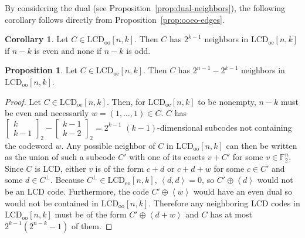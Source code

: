 \documentclass[11pt]{article}
\theoremstyle{definition}
\newtheorem{corollary}[theorem]{Corollary}
\newtheorem{proposition}[theorem]{Proposition}
\newcommand{\F}{\mathbb{F}}
\newcommand{\Qbinom}[3]{{\begin{bmatrix} #1 \\ #2 \end{bmatrix}}_{#3}} %
\newcommand{\Ang}[1]{\left\langle#1\right\rangle}
\newcommand{\LCDoo}[2]{\mathrm{LCD}_{\mathrm{oo}} [#1, #2]}
\newcommand{\LCDoe}[2]{\mathrm{LCD}_{\mathrm{oe}} [#1, #2]}
\newcommand{\LCDeo}[2]{\mathrm{LCD}_{\mathrm{eo}} [#1, #2]}
\begin{document}
By considering the dual (see Proposition~\ref{prop:dual-neighbors}), the following corollary follows directly from Proposition~\ref{prop:ooeo-edges}.

\begin{corollary}\label{cor:oooe-edges}
	Let $C \in \LCDoo{n}{k}$.
	Then $C$ has $2^{k - 1}$ neighbors in $\LCDoe{n}{k}$ if $n - k$ is even and none if $n - k$ is odd.
\end{corollary}

\begin{proposition}\label{prop:oeoo-edges}
	Let $C \in \LCDoe{n}{k}$.
	Then $C$ has $2^{n - 1} - 2^{k - 1}$ neighbors in $\LCDoo{n}{k}$.
\end{proposition}

\begin{proof}
	Let $C \in \LCDoe{n}{k}$.
	Then, for $\LCDoe{n}{k}$ to be nonempty, $n - k$ must be even and necessarily $w = (1, \ldots, 1) \in C$.
	$C$ has $\Qbinom{k}{k - 1}{2} - \Qbinom{k - 1}{k - 2}{2} = 2^{k - 1}$ $(k - 1)$-dimensional subcodes not containing the codeword $w$.
	Any possible neighbor of $C$ in $\LCDoo{n}{k}$ can then be written as the union of such a subcode $C'$ with one of its cosets $v + C'$ for some $v \in \F_2^n$.
	Since $C$ is LCD, either $v$ is of the form $c + d$ or $c + d + w$ for some $c \in C'$ and some $d \in C^\perp$.
	Because $C^\perp \in \LCDeo{n}{k}$, $\Ang{d, d} = 0$, so $C' \oplus \Ang{d}$ would not be an LCD code.
	Furthermore, the code $C' \oplus \Ang{w}$ would have an even dual so would not be contained in $\LCDoo{n}{k}$.
	Therefore any neighboring LCD codes in $\LCDoo{n}{k}$ must be of the form $C' \oplus \Ang{d + w}$ and $C$ has at most $2^{k - 1} (2^{n - k} - 1)$ of them.


\end{proof}
\end{document}
